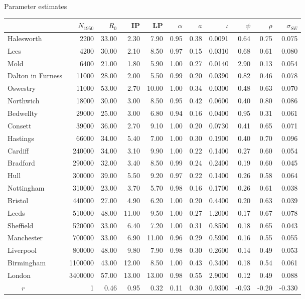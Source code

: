 \begin{frame}[fragile]{Parameter estimates}
\begin{knitrout}\tiny
{}\color{fgcolor}
\begin{tabular}{l|r|r|r|r|r|r|r|r|r|r}
\hline
  & $N_{1950}$ & $R_0$ & IP & LP & $\alpha$ & $a$ & $\iota$ & $\psi$ & $\rho$ & $\sigma_{SE}$\\
\hline
Halesworth & 2200 & 33.00 & 2.30 & 7.90 & 0.95 & 0.38 & 0.0091 & 0.64 & 0.75 & 0.075\\
\hline
Lees & 4200 & 30.00 & 2.10 & 8.50 & 0.97 & 0.15 & 0.0310 & 0.68 & 0.61 & 0.080\\
\hline
Mold & 6400 & 21.00 & 1.80 & 5.90 & 1.00 & 0.27 & 0.0140 & 2.90 & 0.13 & 0.054\\
\hline
Dalton in Furness & 11000 & 28.00 & 2.00 & 5.50 & 0.99 & 0.20 & 0.0390 & 0.82 & 0.46 & 0.078\\
\hline
Oswestry & 11000 & 53.00 & 2.70 & 10.00 & 1.00 & 0.34 & 0.0300 & 0.48 & 0.63 & 0.070\\
\hline
Northwich & 18000 & 30.00 & 3.00 & 8.50 & 0.95 & 0.42 & 0.0600 & 0.40 & 0.80 & 0.086\\
\hline
Bedwellty & 29000 & 25.00 & 3.00 & 6.80 & 0.94 & 0.16 & 0.0400 & 0.95 & 0.31 & 0.061\\
\hline
Consett & 39000 & 36.00 & 2.70 & 9.10 & 1.00 & 0.20 & 0.0730 & 0.41 & 0.65 & 0.071\\
\hline
Hastings & 66000 & 34.00 & 5.40 & 7.00 & 1.00 & 0.30 & 0.1900 & 0.40 & 0.70 & 0.096\\
\hline
Cardiff & 240000 & 34.00 & 3.10 & 9.90 & 1.00 & 0.22 & 0.1400 & 0.27 & 0.60 & 0.054\\
\hline
Bradford & 290000 & 32.00 & 3.40 & 8.50 & 0.99 & 0.24 & 0.2400 & 0.19 & 0.60 & 0.045\\
\hline
Hull & 300000 & 39.00 & 5.50 & 9.20 & 0.97 & 0.22 & 0.1400 & 0.26 & 0.58 & 0.064\\
\hline
Nottingham & 310000 & 23.00 & 3.70 & 5.70 & 0.98 & 0.16 & 0.1700 & 0.26 & 0.61 & 0.038\\
\hline
Bristol & 440000 & 27.00 & 4.90 & 6.20 & 1.00 & 0.20 & 0.4400 & 0.20 & 0.63 & 0.039\\
\hline
Leeds & 510000 & 48.00 & 11.00 & 9.50 & 1.00 & 0.27 & 1.2000 & 0.17 & 0.67 & 0.078\\
\hline
Sheffield & 520000 & 33.00 & 6.40 & 7.20 & 1.00 & 0.31 & 0.8500 & 0.18 & 0.65 & 0.043\\
\hline
Manchester & 700000 & 33.00 & 6.90 & 11.00 & 0.96 & 0.29 & 0.5900 & 0.16 & 0.55 & 0.055\\
\hline
Liverpool & 800000 & 48.00 & 9.80 & 7.90 & 0.98 & 0.30 & 0.2600 & 0.14 & 0.49 & 0.053\\
\hline
Birmingham & 1100000 & 43.00 & 12.00 & 8.50 & 1.00 & 0.43 & 0.3400 & 0.18 & 0.54 & 0.061\\
\hline
London & 3400000 & 57.00 & 13.00 & 13.00 & 0.98 & 0.55 & 2.9000 & 0.12 & 0.49 & 0.088\\
\hline
$\qquad r$ & 1 & 0.46 & 0.95 & 0.32 & 0.11 & 0.30 & 0.9300 & -0.93 & -0.20 & -0.330\\
\hline
\end{tabular}


\end{knitrout}
\end{frame}
